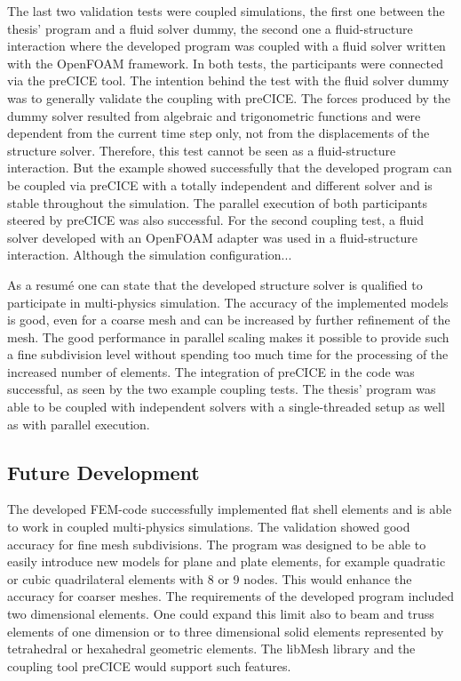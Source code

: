   The last two validation tests were coupled simulations, the first one between the thesis' program and a fluid solver dummy, the second one a fluid-structure interaction where the developed program was coupled with a fluid solver written with the OpenFOAM framework. In both tests, the participants were connected via the preCICE tool. The intention behind the test with the fluid solver dummy was to generally validate the coupling with preCICE. The forces produced by the dummy solver resulted from algebraic and trigonometric functions and were dependent from the current time step only, not from the displacements of the structure solver. Therefore, this test cannot be seen as a fluid-structure interaction. But the example showed successfully that the developed program can be coupled via preCICE with a totally independent and different solver and is stable throughout the simulation. The parallel execution of both participants steered by preCICE was also successful. For the second coupling test, a fluid solver developed with an OpenFOAM adapter was used in a fluid-structure interaction. Although the simulation configuration... %
 
  As a resum\'{e} one can state that the developed structure solver is qualified to participate in multi-physics simulation. The accuracy of the implemented models is good, even for a coarse mesh and can be increased by further refinement of the mesh. The good performance in parallel scaling makes it possible to provide such a fine subdivision level without spending too much time for the processing of the increased number of elements. The integration of preCICE in the code was successful, as seen by the two example coupling tests. The thesis' program was able to be coupled with independent solvers with a single-threaded setup as well as with parallel execution.

 \subsection{Future Development} %
  The developed FEM-code successfully implemented flat shell elements and is able to work in coupled multi-physics simulations. The validation showed good accuracy for fine mesh subdivisions. The program was designed to be able to easily introduce new models for plane and plate elements, for example quadratic or cubic quadrilateral elements with 8 or 9 nodes. This would enhance the accuracy for coarser meshes. The requirements of the developed program included two dimensional elements. One could expand this limit also to beam and truss elements of one dimension or to three dimensional solid elements represented by tetrahedral or hexahedral geometric elements. The libMesh library and the coupling tool preCICE would support such features.
  
